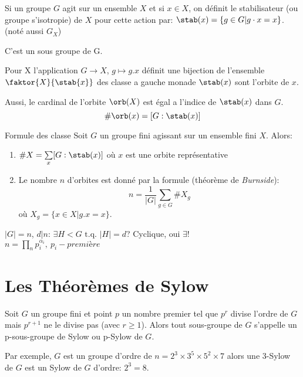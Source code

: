 \begin{definition}
	Si un groupe $G$ agit sur un ensemble $X$ et si $x\in X$, on définit le stabilisateur (ou groupe s'isotropie) de $X$ pour cette action par: $\stab(x)=\{g\in G | g\cdot x=x\}$. (noté aussi $G_X$)
\end{definition}

\begin{proposition}
	C'est un sous groupe de G. %
\end{proposition}

\begin{proposition} 
	Pour X l'application $G\rightarrow X$, $g\mapsto g.x$ définit une bijection de l'ensemble $\faktor{X}{\stab{x}}$ des classe a gauche monade $\stab(x)$ sont l'orbite de $x$.
\end{proposition}

Aussi, le cardinal de l'orbite $\orb(X)$ est égal a l'indice de $\stab(x)$ dans $G$.
$$\#\orb(x) =[G: \stab(x)]$$

\begin{theorem}{Formule des classe}
	Soit $G$ un groupe fini agissant sur un ensemble fini $X$. Alors:
	\begin{enumerate}
		\item $\#X=\sum\limits_x[G: \stab(x)]$ où $x$ est une orbite représentative
		\item Le nombre $n$ d'orbites est donné par la formule (théorème de \emph{Burnside}):
		$$n=\frac{1}{|G|}\sum\limits_{g\in G}\#X_g$$
		où $X_g=\{x\in X | g.x=x\}$.
	\end{enumerate}
\end{theorem}

\begin{remark}
	$|G|=n$, $d | n$: $\exists H<G \text{ t.q. } |H|=d$? Cyclique, oui $\exists !$\\
	$n=\prod\limits_n p_i^{\alpha_i},\ p_i - première$
\end{remark}

\section{Les Théorèmes de Sylow}

Soit $G$ un groupe fini et point $p$ un nombre premier tel que $p^r$ divise l'ordre de $G$ mais $p^{r+1}$ ne le divise pas (avec $r\geq 1$).
Alors tout sous-groupe de $G$ s'appelle un p-sous-groupe de Sylow ou p-Sylow de $G$.

Par exemple, $G$ est un groupe d'ordre de $n=2^3\times 3^5\times 5^2 \times 7$
alors une 3-Sylow de $G$ est un Sylow de $G$ d'ordre: $2^3=8$.

